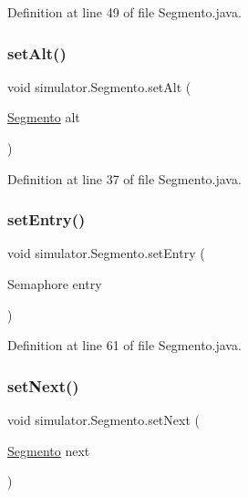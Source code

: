 Definition at line 49 of file Segmento.\+java.

\mbox{\label{classsimulator_1_1_segmento_a9e0d189b9589c76a15b179de7fe716cb}} 
\subsubsection{\texorpdfstring{set\+Alt()}{setAlt()}}
{\footnotesize\ttfamily void simulator.\+Segmento.\+set\+Alt (\begin{DoxyParamCaption}\item[{\mbox{\hyperlink{classsimulator_1_1_segmento}{Segmento}}}]{alt }\end{DoxyParamCaption})}



Definition at line 37 of file Segmento.\+java.

\mbox{\label{classsimulator_1_1_segmento_a412c9085c2cc99e41eb537dd7e0d8e66}} 
\subsubsection{\texorpdfstring{set\+Entry()}{setEntry()}}
{\footnotesize\ttfamily void simulator.\+Segmento.\+set\+Entry (\begin{DoxyParamCaption}\item[{Semaphore}]{entry }\end{DoxyParamCaption})}



Definition at line 61 of file Segmento.\+java.

\mbox{\label{classsimulator_1_1_segmento_a3ff40757a382f8247fd7a3cc70043e58}} 
\subsubsection{\texorpdfstring{set\+Next()}{setNext()}}
{\footnotesize\ttfamily void simulator.\+Segmento.\+set\+Next (\begin{DoxyParamCaption}\item[{\mbox{\hyperlink{classsimulator_1_1_segmento}{Segmento}}}]{next }\end{DoxyParamCaption})}



